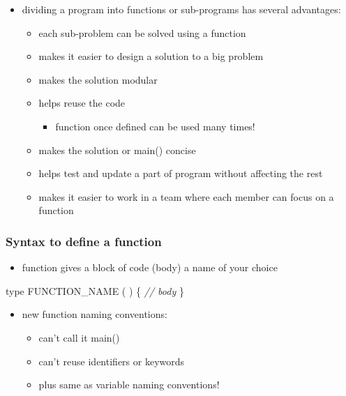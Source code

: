 \documentclass[11pt]{article}
\providecommand{\tightlist}{%
      \setlength{\itemsep}{0pt}\setlength{\parskip}{0pt}}
\newenvironment{Shaded}{}{}
\newcommand{\CommentTok}[1]{\textcolor[rgb]{0.38,0.63,0.69}{\textit{{#1}}}}
\newcommand{\NormalTok}[1]{{#1}}
\newcommand{\OperatorTok}[1]{\textcolor[rgb]{0.40,0.40,0.40}{{#1}}}
\begin{document}
\begin{itemize}
\tightlist
\item
  dividing a program into functions or sub-programs has several
  advantages:

  \begin{itemize}
  \tightlist
  \item
    each sub-problem can be solved using a function
  \item
    makes it easier to design a solution to a big problem
  \item
    makes the solution modular
  \item
    helps reuse the code

    \begin{itemize}
    \tightlist
    \item
      function once defined can be used many times!
    \end{itemize}
  \item
    makes the solution or main() concise
  \item
    helps test and update a part of program without affecting the rest
  \item
    makes it easier to work in a team where each member can focus on a
    function
  \end{itemize}
\end{itemize}

\hypertarget{syntax-to-define-a-function}{%
\subsubsection{Syntax to define a
function}\label{syntax-to-define-a-function}}

\begin{itemize}
\tightlist
\item
  function gives a block of code (body) a name of your choice
\end{itemize}

\begin{Shaded}
\begin{Highlighting}[]
\NormalTok{    type FUNCTION\_NAME }\OperatorTok{(} \OperatorTok{)} \OperatorTok{\{}
       \CommentTok{// body }
    \OperatorTok{\}}
\end{Highlighting}
\end{Shaded}

\begin{itemize}
\tightlist
\item
  new function naming conventions:

  \begin{itemize}
  \tightlist
  \item
    can't call it main()
  \item
    can't reuse identifiers or keywords
  \item
    plus same as variable naming conventions!
  \end{itemize}
\end{itemize}
\end{document}
